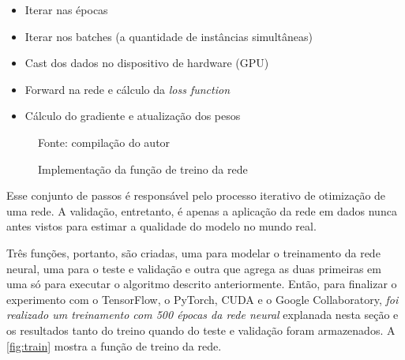\begin{itemize}
	\item Iterar nas épocas
	\item Iterar nos batches (a quantidade de instâncias simultâneas)
	\item Cast dos dados no dispositivo de hardware (GPU)
	\item Forward na rede e cálculo da \textit{loss function}
	\item Cálculo do gradiente e atualização dos pesos
\end{itemize}

\begin{figure}[H]
	\centering
	\caption{Implementação da função de treino da rede}
	
	\label{fig:train}
	{\scriptsize Fonte: compilação do autor}
\end{figure}

Esse conjunto de passos é responsável pelo processo iterativo de otimização de uma rede. A validação, entretanto, é apenas a aplicação da rede em dados nunca antes vistos para estimar a qualidade do modelo no mundo real.

Três funções, portanto, são criadas, uma para modelar o treinamento da rede neural, uma para o teste e validação e outra que agrega as duas primeiras em uma só para executar o algoritmo descrito anteriormente. Então, para finalizar o experimento com o TensorFlow, o PyTorch, CUDA e o Google Collaboratory, \textit{foi realizado um treinamento com 500 épocas da rede neural} explanada nesta seção e os resultados tanto do treino quando do teste e validação foram armazenados. A \autoref{fig:train} mostra a função de treino da rede.  

